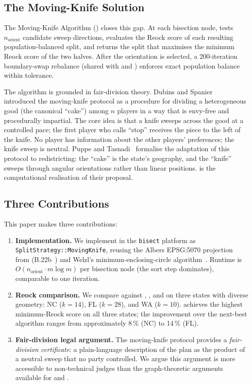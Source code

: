 \subsection{The Moving-Knife Solution}

The Moving-Knife Algorithm (\mka{}) closes this gap.
At each bisection node, \mka{} tests $n_{\mathrm{orient}}$ candidate sweep
directions, evaluates the Reock score of each resulting population-balanced
split, and returns the split that maximises the minimum Reock score of the
two halves.
After the orientation is selected, a 200-iteration boundary-swap rebalance
(shared with \cvdgeo{} and \bfsg{}) enforces exact population balance
within tolerance.

The algorithm is grounded in fair-division theory.
Dubins and Spanier~\citeyear{dubins1961} introduced the moving-knife protocol
as a procedure for dividing a heterogeneous good (the canonical ``cake'') among
$n$ players in a way that is envy-free and procedurally impartial.
The core idea is that a knife sweeps across the good at a controlled pace;
the first player who calls ``stop'' receives the piece to the left of the knife.
No player has information about the other players' preferences; the knife
sweep is neutral.
Puppe and Tasnadi~\citeyear{puppe2026} formalise the adaptation of this
protocol to redistricting: the ``cake'' is the state's geography, and the
``knife'' sweeps through angular orientations rather than linear positions.
\mka{} is the computational realisation of their proposal.

\subsection{Three Contributions}

This paper makes three contributions:

\begin{enumerate}
\item \textbf{Implementation.}
  We implement \mka{} in the \texttt{bisect} platform as
  \texttt{SplitStrategy::MovingKnife}, reusing the Albers EPSG:5070
  projection from \cvdgeo{} (B.22b~\citep{dellaLibera2026cvdgeo}) and
  Welzl's minimum-enclosing-circle algorithm~\citep{welzl1991}.
  Runtime is $O(n_{\mathrm{orient}} \cdot m \log m)$ per bisection node
  (the sort step dominates), comparable to one \cvdgeo{} iteration.

\item \textbf{Reock comparison.}
  We compare \mka{} against \metis{}, \cvdgeo{}, and \bfsg{} on three
  states with diverse geometry: NC ($k=14$), FL ($k=28$), and WA ($k=10$).
  \mka{} achieves the highest minimum-Reock score on all three states;
  the improvement over the next-best algorithm ranges from approximately
  8\,\% (NC) to 14\,\% (FL).

\item \textbf{Fair-division legal argument.}
  The moving-knife protocol provides a \emph{fair-division certificate}:
  a plain-language description of the plan as the product of a neutral
  sweep that no party controlled.
  We argue this argument is more accessible to non-technical judges than
  the graph-theoretic arguments available for \metis{} and \cvdgeo{}.
\end{enumerate}

